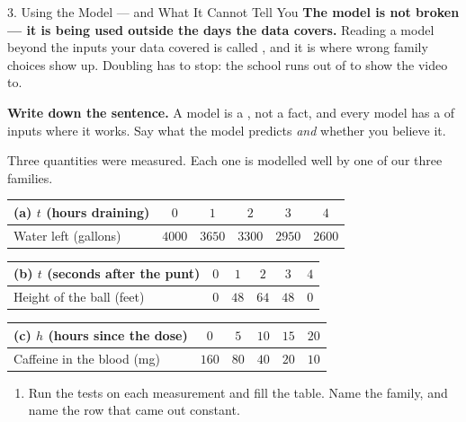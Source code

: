 \documentclass[10pt]{article}
\begin{document}
\begin{notesbox}{3. Using the Model --- and What It Cannot Tell You}
\vspace{4pt}
\textbf{The model is not broken --- it is being used outside the days the data covers.} Reading a
model beyond the inputs your data covered is called \blank{3.0cm}, and it is where wrong family
choices show up. Doubling has to stop: the school runs out of \blank{3.0cm} to show the video to.

\vspace{4pt}
\textbf{Write down the sentence.} A model is a \blank{1.6cm}, not a fact, and every model has a
\blank{2.4cm} of inputs where it works. Say what the model predicts \emph{and} whether you believe it.
\end{notesbox}

\vspace{0.10in}

\boxguard[30]
\begin{practicebox}
\small
Three quantities were measured. Each one is modelled well by one of our three families.

\vspace{4pt}
\renewcommand{\arraystretch}{1.3}
\begin{center}
\begin{tabular}{@{}|l|c|c|c|c|c|@{}}
\hline
\textbf{(a)} $t$ (hours draining) & $0$ & $1$ & $2$ & $3$ & $4$ \\ \hline
Water left (gallons) & $4000$ & $3650$ & $3300$ & $2950$ & $2600$ \\
\hline
\end{tabular}

\smallskip
\begin{tabular}{@{}|l|c|c|c|c|c|@{}}
\hline
\textbf{(b)} $t$ (seconds after the punt) & $0$ & $1$ & $2$ & $3$ & $4$ \\ \hline
Height of the ball (feet) & $0$ & $48$ & $64$ & $48$ & $0$ \\
\hline
\end{tabular}

\smallskip
\begin{tabular}{@{}|l|c|c|c|c|c|@{}}
\hline
\textbf{(c)} $h$ (hours since the dose) & $0$ & $5$ & $10$ & $15$ & $20$ \\ \hline
Caffeine in the blood (mg) & $160$ & $80$ & $40$ & $20$ & $10$ \\
\hline
\end{tabular}
\end{center}

\begin{enumerate}[leftmargin=1.6em, itemsep=6pt, topsep=6pt]
  \item Run the tests on each measurement and fill the table. Name the family, and name the row that
        came out constant.
\smallskip


\end{enumerate}
\end{practicebox}
\end{document}
